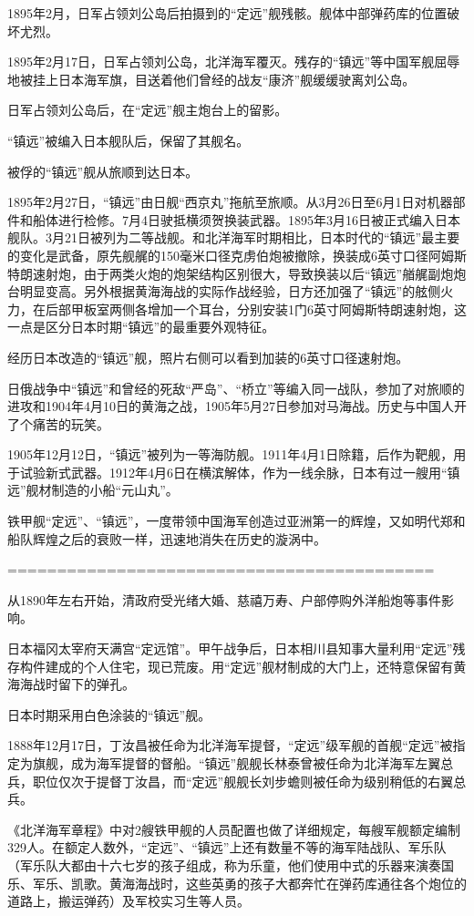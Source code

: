 \documentclass[12pt,UTF8]{ctexbook}
\begin{document}
1895年2月，日军占领刘公岛后拍摄到的“定远”舰残骸。舰体中部弹药库的位置破坏尤烈。

1895年2月17日，日军占领刘公岛，北洋海军覆灭。残存的“镇远”等中国军舰屈辱地被挂上日本海军旗，目送着他们曾经的战友“康济”舰缓缓驶离刘公岛。

日军占领刘公岛后，在“定远”舰主炮台上的留影。

“镇远”被编入日本舰队后，保留了其舰名。

被俘的“镇远”舰从旅顺到达日本。

1895年2月27日，“镇远”由日舰“西京丸”拖航至旅顺。从3月26日至6月1日对机器部件和船体进行检修。7月4日驶抵横须贺换装武器。1895年3月16日被正式编入日本舰队。3月21日被列为二等战舰。和北洋海军时期相比，日本时代的“镇远”最主要的变化是武备，原先舰艉的150毫米口径克虏伯炮被撤除，换装成6英寸口径阿姆斯特朗速射炮，由于两类火炮的炮架结构区别很大，导致换装以后“镇远”艏艉副炮炮台明显变高。另外根据黄海海战的实际作战经验，日方还加强了“镇远”的舷侧火力，在后部甲板室两侧各增加一个耳台，分别安装1门6英寸阿姆斯特朗速射炮，这一点是区分日本时期“镇远”的最重要外观特征。

经历日本改造的“镇远”舰，照片右侧可以看到加装的6英寸口径速射炮。

日俄战争中“镇远”和曾经的死敌“严岛”、“桥立”等编入同一战队，参加了对旅顺的进攻和1904年4月10日的黄海之战，1905年5月27日参加对马海战。历史与中国人开了个痛苦的玩笑。

1905年12月12日，“镇远”被列为一等海防舰。1911年4月1日除籍，后作为靶舰，用于试验新式武器。1912年4月6日在横滨解体，作为一线余脉，日本有过一艘用“镇远”舰材制造的小船“元山丸”。

铁甲舰“定远”、“镇远”，一度带领中国海军创造过亚洲第一的辉煌，又如明代郑和船队辉煌之后的衰败一样，迅速地消失在历史的漩涡中。

===========================================

从1890年左右开始，清政府受光绪大婚、慈禧万寿、户部停购外洋船炮等事件影响。

日本福冈太宰府天满宫“定远馆”。甲午战争后，日本相川县知事大量利用“定远”残存构件建成的个人住宅，现已荒废。用“定远”舰材制成的大门上，还特意保留有黄海海战时留下的弹孔。

日本时期采用白色涂装的“镇远”舰。

1888年12月17日，丁汝昌被任命为北洋海军提督，“定远”级军舰的首舰“定远”被指定为旗舰，成为海军提督的督船。“镇远”舰舰长林泰曾被任命为北洋海军左翼总兵，职位仅次于提督丁汝昌，而“定远”舰舰长刘步蟾则被任命为级别稍低的右翼总兵。

《北洋海军章程》中对2艘铁甲舰的人员配置也做了详细规定，每艘军舰额定编制329人。在额定人数外，“定远”、“镇远”上还有数量不等的海军陆战队、军乐队（军乐队大都由十六七岁的孩子组成，称为乐童，他们使用中式的乐器来演奏国乐、军乐、凯歌。黄海海战时，这些英勇的孩子大都奔忙在弹药库通往各个炮位的道路上，搬运弹药）及军校实习生等人员。
\end{document}
